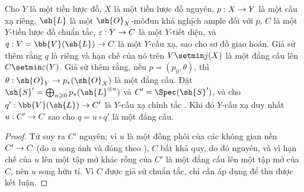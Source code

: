 \documentclass[oneside,10pt]{amsart}
\makeatletter
\renewcommand{\geq}{\geqslant}
\newcommand{\ega@arrow}[2]{\mathchoice{#1}{#2}{#2}{#2}}
\renewcommand{\to}{\ega@arrow{\longrightarrow}{\rightarrow}}
\let\EGAOriginalLabel\label
\renewcommand{\label}[1]{\phantomsection\EGAOriginalLabel{#1}}
\makeatother
\begin{document}
\begin{proposition}[8.11.7]
\label{II.8.11.7}
Cho $Y$ là một tiền lược đồ, $X$ là một tiền lược đồ nguyên, $p:X\to Y$ là một cấu xạ riêng, $\sh{L}$ là một $\sh{O}_X$-môđun khả nghịch ample đối với $p$, $C$ là một $Y$-tiền lược đồ chuẩn tắc, $\varepsilon:Y\to C$ là một $Y$-tiết diện, và $q:V=\bb{V}(\sh{L})\to C$ là một $Y$-cấu xạ, sao cho sơ đồ  giao hoán.
Giả sử thêm rằng $q$ là riêng và hạn chế của nó trên $V\setmin j(X)$ là một đẳng cấu lên $C\setmin\varepsilon(Y)$.
Giả sử thêm rằng, nếu $p=(p_0,\theta)$, thì $\theta:\sh{O}_Y\to p_*(\sh{O}_X)$ là một đẳng cấu.
Đặt $\sh{S}'=\bigoplus_{n\geq0}p_*(\sh{L}^{\otimes n})$ và $C'=\Spec(\sh{S}')$, và cho $q':\bb{V}(\sh{L})\to C'$ là $Y$-cấu xạ chính tắc .
Khi đó $Y$-cấu xạ duy nhất $u:C'\to C$ sao cho $q=u\circ q'$ là một đẳng cấu.
\end{proposition}

\begin{proof}
Từ  suy ra $C'$ nguyên;
vì $u$ là một đồng phôi của các không gian nền $C'\to C$ (do $u$ song ánh và đóng theo ), $C$ bất khả quy, do đó nguyên, và vì hạn chế của $u$ lên một tập mở khác rỗng của $C'$ là một đẳng cấu lên một tập mở của $C$, nên $u$ song hữu tỉ.
Vì $C$ được giả sử chuẩn tắc, chỉ cần áp dụng  để thu được kết luận.
\end{proof}
\end{document}
